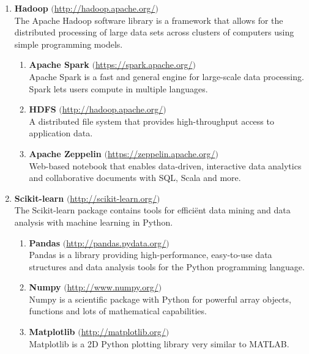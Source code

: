 \begin{enumerate}
    \item \textbf{Hadoop} $($\url{http://hadoop.apache.org/}$)$ \\
    The Apache Hadoop software library is a framework that allows for the distributed processing of large data sets across clusters of computers using simple programming models. 
    \begin{enumerate}
        \item \textbf{Apache Spark} $($\url{https://spark.apache.org/}$)$\\
        Apache Spark is a fast and general engine for large-scale data processing. Spark lets users compute in multiple languages.
        \item \textbf{HDFS} $($\url{http://hadoop.apache.org/}$)$ \\
         A distributed file system that provides high-throughput access to application data.
         \item \textbf{Apache Zeppelin} $($\url{https://zeppelin.apache.org/}$)$ \\
         Web-based notebook that enables data-driven, interactive data analytics and collaborative documents with SQL, Scala and more.
    \end{enumerate}
    
    \item \textbf{Scikit-learn} $($\url{http://scikit-learn.org/}$)$ \\
    The Scikit-learn package contains tools for effici\"ent data mining and data analysis with machine learning in Python.
    \begin{enumerate}
        \item \textbf{Pandas} $($\url{http://pandas.pydata.org/}$)$ \\
        Pandas is a library providing high-performance, easy-to-use data structures and data analysis tools for the Python programming language.
        \item \textbf{Numpy} $($\url{http://www.numpy.org/}$)$ \\
        Numpy is a scientific package with Python for powerful array objects, functions and lots of mathematical capabilities.
        \item \textbf{Matplotlib} $($\url{http://matplotlib.org/}$)$ \\
        Matplotlib is a 2D Python plotting library very similar to MATLAB.
        
    \end{enumerate}
    
\end{enumerate}

